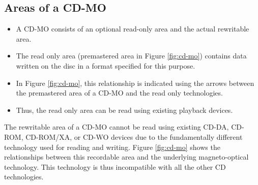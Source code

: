 \subsection*{Areas of a CD-MO}
\begin{itemize}
	\item A CD-MO consists of an optional read-only area and the actual rewritable area.
	\item The read only area (premastered area in Figure {\ref{fig:cd-mo}}) contains data written on the disc in a format specified for this purpose. 
	\item In Figure {\ref{fig:cd-mo}}, this relationship is indicated using the arrows between the premastered area of a CD-MO and the read only technologies. 
	\item Thus, the read only area can be read using existing playback devices.
\end{itemize}

 The rewritable area of a CD-MO cannot be read using existing CD-DA, CD-ROM, CD-ROM/XA, or CD-WO devices due to the fundamentally different technology used for reading and writing. Figure {\ref{fig:cd-mo}} shows the relationships between this recordable area and the underlying magneto-optical technology. This technology is thus incompatible with all the other CD technologies.

\newpage\thispagestyle{empty}